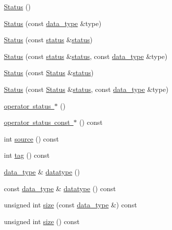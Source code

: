 \begin{DoxyCompactItemize}
\item 
\mbox{\hyperlink{classfemus_1_1_parallel_1_1_status_a22333a3cb6ad0ff5f8e0a157e884ad15}{Status}} ()
\item 
\mbox{\hyperlink{classfemus_1_1_parallel_1_1_status_a6ab85fbd1839c12c36fceeefd6bbb78c}{Status}} (const \mbox{\hyperlink{structfemus_1_1_parallel_1_1data__type}{data\+\_\+type}} \&type)
\item 
\mbox{\hyperlink{classfemus_1_1_parallel_1_1_status_a2169ad84c6b8520608b309c70f51f3f0}{Status}} (const \mbox{\hyperlink{structfemus_1_1_parallel_1_1status}{status}} \&\mbox{\hyperlink{structfemus_1_1_parallel_1_1status}{status}})
\item 
\mbox{\hyperlink{classfemus_1_1_parallel_1_1_status_a8b68cd77721e2b75173f8bba06f87bfe}{Status}} (const \mbox{\hyperlink{structfemus_1_1_parallel_1_1status}{status}} \&\mbox{\hyperlink{structfemus_1_1_parallel_1_1status}{status}}, const \mbox{\hyperlink{structfemus_1_1_parallel_1_1data__type}{data\+\_\+type}} \&type)
\item 
\mbox{\hyperlink{classfemus_1_1_parallel_1_1_status_a6385d3bd2621fc0fd98700efd4772702}{Status}} (const \mbox{\hyperlink{classfemus_1_1_parallel_1_1_status}{Status}} \&\mbox{\hyperlink{structfemus_1_1_parallel_1_1status}{status}})
\item 
\mbox{\hyperlink{classfemus_1_1_parallel_1_1_status_a998e0ca9de0b0f42adaa3f4d34caa766}{Status}} (const \mbox{\hyperlink{classfemus_1_1_parallel_1_1_status}{Status}} \&\mbox{\hyperlink{structfemus_1_1_parallel_1_1status}{status}}, const \mbox{\hyperlink{structfemus_1_1_parallel_1_1data__type}{data\+\_\+type}} \&type)
\item 
\mbox{\hyperlink{classfemus_1_1_parallel_1_1_status_a2d27eec990ee5645d1cff1a07e3ab676}{operator status $\ast$}} ()
\item 
\mbox{\hyperlink{classfemus_1_1_parallel_1_1_status_a2e3b3b28178c6bce4f178e4509abbc1a}{operator status const $\ast$}} () const
\item 
int \mbox{\hyperlink{classfemus_1_1_parallel_1_1_status_a55bc0576219d94eef6f4e792a8c3d0ca}{source}} () const
\item 
int \mbox{\hyperlink{classfemus_1_1_parallel_1_1_status_a3fa17871eee7b79ceba1b24d749ec690}{tag}} () const
\item 
\mbox{\hyperlink{structfemus_1_1_parallel_1_1data__type}{data\+\_\+type}} \& \mbox{\hyperlink{classfemus_1_1_parallel_1_1_status_a993ed62e0f7230ff534ffd1d7d892ee5}{datatype}} ()
\item 
const \mbox{\hyperlink{structfemus_1_1_parallel_1_1data__type}{data\+\_\+type}} \& \mbox{\hyperlink{classfemus_1_1_parallel_1_1_status_ace75924e5758671984516f1eb8a080c4}{datatype}} () const
\item 
unsigned int \mbox{\hyperlink{classfemus_1_1_parallel_1_1_status_a5a5355589d1a7a2bd2f42896e1ee484a}{size}} (const \mbox{\hyperlink{structfemus_1_1_parallel_1_1data__type}{data\+\_\+type}} \&) const
\item 
unsigned int \mbox{\hyperlink{classfemus_1_1_parallel_1_1_status_a858333e5b13f5102d42519bf5b13bd64}{size}} () const
\end{DoxyCompactItemize}


